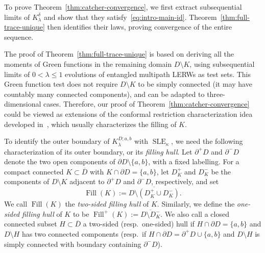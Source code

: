 \documentclass[11pt]{article}
\numberwithin{equation}{section}
\newcommand{\1}{\mathbf{1}}
\DeclareMathOperator{\SLE}{SLE}
\newcommand\ol[1]{\overline{#1}}
\begin{document}
To prove Theorem~\ref{thm:catcher-convergence}, we first
extract subsequential limits of $K_\lambda^\delta$ and show that they satisfy~\eqref{eq:intro-main-id}. Theorem~\ref{thm:full-trace-unique} then identifies their laws, proving convergence of the entire sequence.

The proof of Theorem~\ref{thm:full-trace-unique} is based on deriving all the moments of Green functions in the remaining domain $D\setminus K$, using subsequential limits of $0<\lambda\le1$ evolutions of entangled multipath LERWs as test sets. This Green function test does not require $D\setminus K$ to be simply connected (it may have countably many connected components), and can be adapted to three-dimensional cases. Therefore, our proof of Theorem~\ref{thm:catcher-convergence} could be viewed as extensions of the conformal restriction characterization idea developed in~\cite{lsw-restriction,wu15,qian-trichordal,qian2021generalized,BJ2024,gordina2024infinitesimal,CG25}, which usually characterizes the filling of $K$.

To identify the outer boundary of $K_\lambda^{D;a,b}$ with $\SLE_\kappa$, we need the following characterization of its outer boundary, or its \emph{filling hull}.
Let \(\partial^+D\) and \(\partial^-D\) denote the two open components of
\(\partial D\setminus\{a,b\}\), with a fixed labelling.  For a compact
connected \(K\subset\ol D\) with \(K\cap\partial D=\{a,b\}\), let
\(D_K^+\) and \(D_K^-\) be the components of \(D\setminus K\) adjacent to
\(\partial^+D\) and \(\partial^-D\), respectively, and
set
\[
 \operatorname{Fill}(K)
 :=\ol{D\setminus(D_K^+\cup D_K^-)}.
\]
We call $\operatorname{Fill}(K)$ the \emph{two-sided filling hull} of $K$. Similarly,  we define the
\emph{one-sided filling hull} of $K$ to be $\operatorname{Fill}^{+}(K):=\ol{D\setminus D_K^-}$. We also call a closed connected subset $H\subset \ol D$ a two-sided (resp.~one-sided) hull if $H\cap\partial D=\{a,b\}$ and $D\setminus H$ has two connected components (resp.~if $H\cap\partial D=\partial^+D\cup\{a,b\}$ and $D\setminus H$ is simply connected with boundary containing $\partial^-D$).
\end{document}

